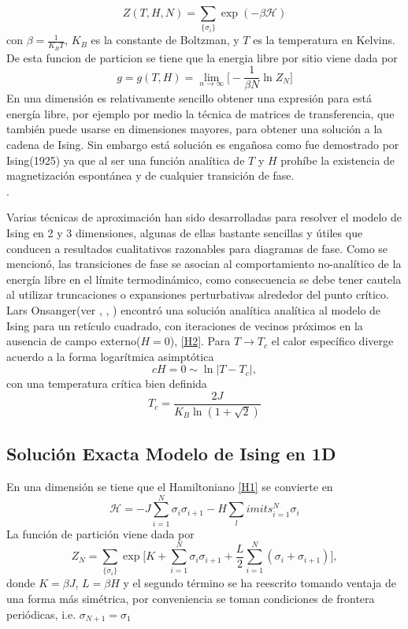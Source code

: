 \documentclass[a4paper]{article}
\begin{document}
\begin{equation}\label{partition}
Z(T,H,N)=\sum_{\{ \sigma_i\}}\exp(-\beta \mathcal{H})
\end{equation}
con $\beta=\frac{1}{K_B T}$, $K_B$ es la constante de Boltzman, y $T$ es la temperatura en Kelvins. De esta funcion de particion se tiene que la energia libre por sitio viene dada por
\begin{equation}
g=g(T,H)=\lim_{n\to \infty}\Bigg[-\frac{1}{\beta N}\ln Z_N\Bigg]
\end{equation}
En una dimensión es relativamente sencillo obtener una expresión para está energía libre, por ejemplo por medio la técnica de matrices de transferencia, que también puede usarse en dimensiones mayores, para obtener una solución a la cadena de Ising. Sin embargo está solución es engañosa como fue demostrado por Ising(1925) ya que al ser una función analítica de $T$ y $H$ prohíbe la existencia de magnetización espontánea y de cualquier transición de fase.\\.

Varias técnicas de aproximación han sido desarrolladas para resolver el modelo de Ising en 2 y 3 dimensiones, algunas de ellas bastante sencillas y útiles que conducen a resultados cualitativos razonables para diagramas de fase. Como se mencionó, las transiciones de fase se asocian al comportamiento no-analítico de la energía libre en el límite termodinámico, como consecuencia se debe tener cautela al utilizar truncaciones o expansiones perturbativas alrededor del punto crítico.\\
Lars Onsanger(ver \cite{Pathria}, \cite{Onsanger}, \cite{Baxter}) encontró una solución analítica analítica al modelo de Ising para un retículo cuadrado, con iteraciones de vecinos próximos en la ausencia de campo externo($H=0$), \ref{H2}. Para $T\to T_c$ el calor específico diverge acuerdo a la forma logarítmica asimptótica
\begin{equation}
c{H=0}\sim \ln|T-T_c|,
\end{equation}
con una temperatura crítica bien definida
\begin{equation}\label{Tc}
T_c=\frac{2J}{K_B \ln(1+\sqrt{2})}
\end{equation}
\subsection{Solución Exacta Modelo de Ising en 1D}
En una dimensión se tiene que el Hamiltoniano \ref{H1} se convierte en 
\begin{equation}
\mathcal{H}=-J\sum_{i=1}^{N}\sigma_i\sigma_{i+1}-H\sum_limits_{i=1}^{N}\sigma_i
\end{equation}
La función de partición viene dada por 
\begin{equation}
Z_N=\sum_{\{\sigma_i \}}\exp\Bigg[ K+\sum_{i=1}^{N}\sigma_i\sigma_{i+1}+\frac{L}{2}\sum_{i=1}^{N}(\sigma_i+\sigma_{i+1}) \Bigg],
\end{equation}
donde $K=\beta J$, $L=\beta H$ y el segundo término se ha reescrito tomando ventaja de una forma más simétrica, por conveniencia se toman condiciones de frontera periódicas, i.e. $\sigma_{N+1}=\sigma_1$
\end{document}
